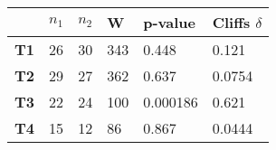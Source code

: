 \begin{tabular}{llllll}
\hline
            & \textbf{$n_1$} & \textbf{$n_2$} & \textbf{W} & \textbf{p-value} & \textbf{Cliffs $\delta$} \\ \hline
\textbf{T1} & 26                      & 30                       & 343        & 0.448           & 0.121     \\
\textbf{T2} & 29                      & 27                       & 362        & 0.637           & 0.0754    \\
\textbf{T3} & 22                      & 24                       & 100        & 0.000186        & 0.621     \\
\textbf{T4} & 15                      & 12                       & 86         & 0.867           & 0.0444    \\ \hline
\end{tabular}

